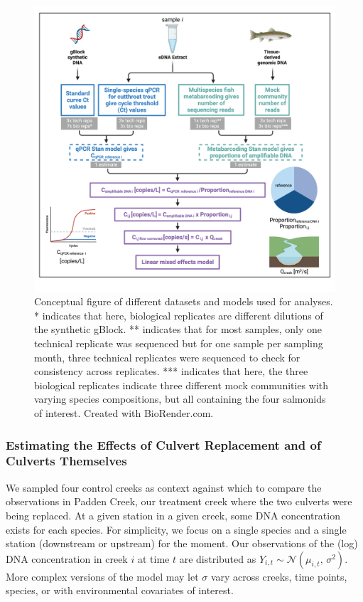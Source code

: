 \documentclass[
]{article}
\begin{document}
\begin{figure}
\centering
\includegraphics{../Output/Figures/NGN_Fig3.png}
\caption{Conceptual figure of different datasets and models used for
analyses. * indicates that here, biological replicates are different
dilutions of the synthetic gBlock. ** indicates that for most samples,
only one technical replicate was sequenced but for one sample per
sampling month, three technical replicates were sequenced to check for
consistency across replicates. *** indicates that here, the three
biological replicates indicate three different mock communities with
varying species compositions, but all containing the four salmonids of
interest. Created with BioRender.com.\label{fig:conceptualfig}}
\end{figure}

\hypertarget{estimating-the-effects-of-culvert-replacement-and-of-culverts-themselves}{%
\subsubsection{Estimating the Effects of Culvert Replacement and of
Culverts
Themselves}\label{estimating-the-effects-of-culvert-replacement-and-of-culverts-themselves}}

We sampled four control creeks as context against which to compare the
observations in Padden Creek, our treatment creek where the two culverts
were being replaced. At a given station in a given creek, some DNA
concentration exists for each species. For simplicity, we focus on a
single species and a single station (downstream or upstream) for the
moment. Our observations of the (log) DNA concentration in creek \(i\)
at time \(t\) are distributed as
\(Y_{i,t} \sim \mathcal{N}(\mu_{i,t},\,\sigma^{2})\). More complex
versions of the model may let \(\sigma\) vary across creeks, time
points, species, or with environmental covariates of interest.
\end{document}
